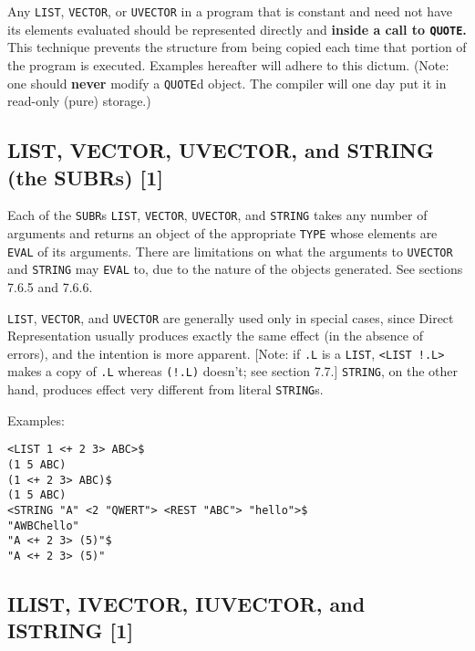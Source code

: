 \documentclass[a4paper]{scrbook}
\begin{document}
Any \texttt{LIST}, \texttt{VECTOR}, or \texttt{UVECTOR}
in a program that is constant and need not have its elements evaluated should be represented directly and \textbf{inside a
call to \texttt{QUOTE}.} This technique prevents the structure from being copied each time that portion of the program is
executed. Examples hereafter will adhere to this dictum. (Note: one should \textbf{never} modify a \texttt{QUOTE}d object.
The compiler will one day put it in read-only (pure) storage.)

\subsection{LIST, VECTOR, UVECTOR, and STRING (the SUBRs)
{[}1{]}}\label{list-vector-uvector-and-string-the-subrs-1}

Each of the \texttt{SUBR}s \texttt{LIST}, \texttt{VECTOR},
\texttt{UVECTOR}, and \texttt{STRING} takes any number of
arguments and returns an object of the appropriate \texttt{TYPE} whose elements are \texttt{EVAL} of its arguments. There
are limitations on what the arguments to \texttt{UVECTOR} and \texttt{STRING} may \texttt{EVAL} to, due to the nature of
the objects generated. See sections 7.6.5 and 7.6.6.

\texttt{LIST}, \texttt{VECTOR}, and \texttt{UVECTOR} are generally used only in special cases, since Direct Representation
usually produces exactly the same effect (in the absence of errors), and the intention is more apparent. {[}Note: if
\texttt{.L} is a \texttt{LIST}, \texttt{\textless{}LIST\ !.L\textgreater{}} makes a copy of \texttt{.L} whereas
\texttt{(!.L)} doesn't; see section 7.7.{]} \texttt{STRING}, on the other hand, produces effect very different from literal
\texttt{STRING}s.

Examples:

\begin{verbatim}
<LIST 1 <+ 2 3> ABC>$
(1 5 ABC)
(1 <+ 2 3> ABC)$
(1 5 ABC)
<STRING "A" <2 "QWERT"> <REST "ABC"> "hello">$
"AWBChello"
"A <+ 2 3> (5)"$
"A <+ 2 3> (5)"
\end{verbatim}

\subsection{ILIST, IVECTOR, IUVECTOR, and ISTRING {[}1{]}}\label{ilist-ivector-iuvector-and-istring-1}
\end{document}
